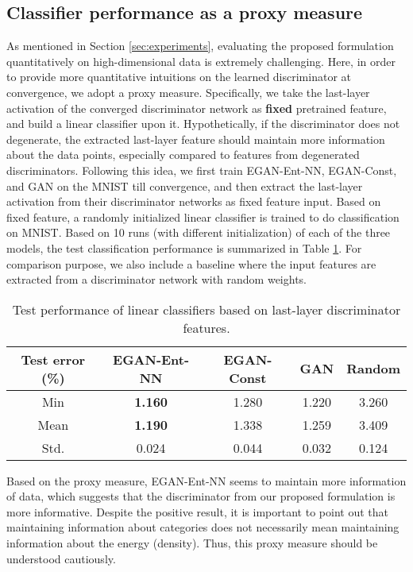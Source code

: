 \documentclass[a4paper]{article}
\begin{document}
\subsection{Classifier performance as a proxy measure}
As mentioned in Section \ref{sec:experiments}, evaluating the proposed formulation quantitatively on high-dimensional data is extremely challenging.
Here, in order to provide more quantitative intuitions on the learned discriminator at convergence, we adopt a proxy measure.
Specifically, we take the last-layer activation of the converged discriminator network as \textbf{fixed} pretrained feature, and build a linear classifier upon it. 
Hypothetically, if the discriminator does not degenerate, the extracted last-layer feature should maintain more information about the data points, especially compared to features from degenerated discriminators.
Following this idea, we first train EGAN-Ent-NN, EGAN-Const, and GAN on the MNIST till convergence, and then extract the last-layer activation from their discriminator networks as fixed feature input.
Based on fixed feature, a randomly initialized linear classifier is trained to do classification on MNIST.
Based on 10 runs (with different initialization) of each of the three models, the test classification performance is summarized in Table \ref{tab:proxy_fixed}.
For comparison purpose, we also include a baseline where the input features are extracted from a discriminator network with random weights.

\begin{table}[h!]
\centering
\begin{tabular}{c | c | c | c | c } 
\toprule
Test error (\%) & EGAN-Ent-NN & EGAN-Const & GAN & Random \\
\midrule
Min  & \textbf{1.160} & 1.280 & 1.220 & 3.260 \\
Mean & \textbf{1.190} & 1.338 & 1.259 & 3.409 \\ 
Std. & 0.024          & 0.044 & 0.032 & 0.124 \\
\bottomrule
\end{tabular}
\caption{Test performance of linear classifiers based on last-layer discriminator features.}
\label{tab:proxy_fixed}
\end{table}

Based on the proxy measure, EGAN-Ent-NN seems to maintain more information of data, which suggests that the discriminator from our proposed formulation is more informative.
Despite the positive result, it is important to point out that maintaining information about categories does not necessarily mean maintaining information about the energy (density).
Thus, this proxy measure should be understood cautiously. 

 
\end{document}
